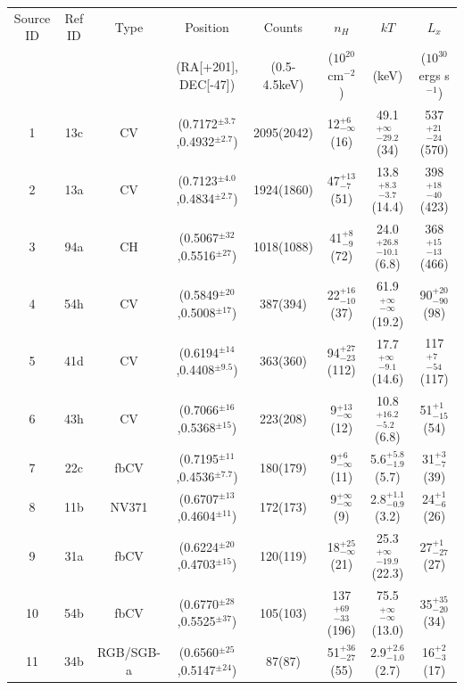 \documentclass[aps,
                pra,  
                a4paper, 
                amsmath, 
                amssymb, 
                preprint,
                tightenlines,  
                amsfonts,
                nofootinbib,
                notitlepage
            ]{revtex4-2}
\begin{document}
\begin{center}
    \begin{table}
    \begin{tabular}{cccccccc}
        \hline
        Source ID & Ref \cite{Henleywillis2018} ID & Type & Position & Counts & $n_H$ & $kT$ & $L_x$\\
        & & & (RA[+201], DEC[-47]) & (0.5-4.5keV) & ($10^{20}$cm$^{-2}$) & (keV) & ($10^{30}$ ergs s$^{-1}$)\\
        \hline
        1 & 13c & CV & (0.7172$^{\pm3.7}$,0.4932$^{\pm2.7}$) & 2095(2042) & 12$^{+6}_{-\infty}$(16) & 49.1$^{+\infty}_{-29.2}$(34) & 537$^{+21}_{-24}$(570)\\
        2 & 13a & CV & (0.7123$^{\pm4.0}$,0.4834$^{\pm2.7}$) & 1924(1860) & 47$^{+13}_{-7}$(51) & 13.8$^{+8.3}_{-3.7}$(14.4) & 398$^{+18}_{-40}$(423)\\
        3 & 94a & CH & (0.5067$^{\pm32}$,0.5516$^{\pm27}$) & 1018(1088) & 41$^{+8}_{-9}$(72) & 24.0$^{+26.8}_{-10.1}$(6.8) & 368$^{+15}_{-13}$(466)\\
        4 & 54h & CV & (0.5849$^{\pm20}$,0.5008$^{\pm17}$) & 387(394) & 22$^{+16}_{-10}$(37) & 61.9$^{+\infty}_{-\infty}$(19.2) & 90$^{+20}_{-90}$(98)\\
        5 & 41d & CV & (0.6194$^{\pm14}$,0.4408$^{\pm9.5}$) & 363(360) & 94$^{+27}_{-23}$(112) & 17.7$^{+\infty}_{-9.1}$(14.6) & 117$^{+7}_{-54}$(117)\\
        6 & 43h & CV & (0.7066$^{\pm16}$,0.5368$^{\pm15}$) & 223(208) & 9$^{+13}_{-\infty}$(12) & 10.8$^{+16.2}_{-5.2}$(6.8) & 51$^{+1}_{-15}$(54)\\
        7 & 22c & fbCV & (0.7195$^{\pm11}$,0.4536$^{\pm7.7}$) & 180(179) & 9$^{+6}_{-\infty}$(11) & 5.6$^{+5.8}_{-1.9}$(5.7) & 31$^{+3}_{-7}$(39)\\
        8 & 11b & NV371 & (0.6707$^{\pm13}$,0.4604$^{\pm11}$) & 172(173) & 9$^{+\infty}_{-\infty}$(9) & 2.8$^{+1.1}_{-0.9}$(3.2) & 24$^{+1}_{-6}$(26)\\
        9 & 31a & fbCV & (0.6224$^{\pm20}$,0.4703$^{\pm15}$) & 120(119) & 18$^{+25}_{-\infty}$(21) & 25.3$^{+\infty}_{-19.9}$(22.3) & 27$^{+1}_{-27}$(27)\\
        10 & 54b & fbCV & (0.6770$^{\pm28}$,0.5525$^{\pm37}$) & 105(103) & 137$^{+69}_{-33}$(196) & 75.5$^{+\infty}_{-\infty}$(13.0) & 35$^{+35}_{-20}$(34)\\
        11 & 34b & RGB/SGB-a & (0.6560$^{\pm25}$,0.5147$^{\pm24}$) & 87(87) & 51$^{+36}_{-27}$(55) & 2.9$^{+2.6}_{-1.0}$(2.7) & 16$^{+2}_{-3}$(17)\\

\end{tabular}
\end{table}
\end{center}
\end{document}

